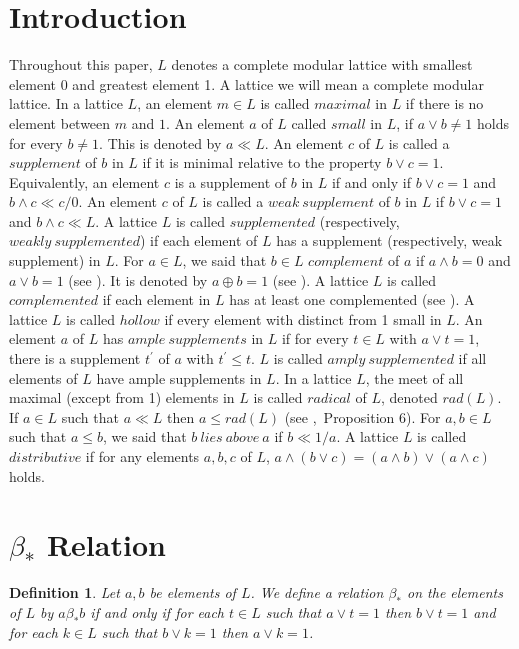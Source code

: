 \documentclass[a4paper,12pt]{article}
\newtheorem{definition}[theorem]{Definition}
\numberwithin{equation}{section}
\newcommand{\mycite}[2]{\textnormal{\cite{#1},~#2}}
\begin{document}
\section{Introduction}
Throughout this paper, $ L $ denotes a complete modular lattice with smallest element 0 and 
greatest element 1. A lattice we will mean a complete modular lattice. In a lattice $ L $, an element $ m \in L $ is called $ maximal $ in $ L $ if there is no element between $ m $ and $ 1 $. An element $ a $ of $ L $ 
called $ small $ in $ L $, if $ a \vee b \neq 1 $ holds for every $ b \neq 1 $. This is denoted by $ a \ll L $. An element $ c $ of $ L $ is called a $ supplement $ of $ b $ in $ L $ 
if it is minimal relative to the property $ b \vee c = 1 $. Equivalently, an element $ c $ is a supplement of $ b $ in $ L $ if and only if $ b \vee c = 1 $ and 
$ b \wedge c \ll c/0 $. An element $ c $ of $ L $ is called a $ weak \ supplement $ of $ b $ in $ L $ if $ b \vee c = 1 $ and $ b \wedge c \ll L $. A lattice $ L $ is called 
$ supplemented $ (respectively, $ weakly \ supplemented $) if each element of $ L $ has a supplement (respectively, weak supplement) in $ L $.
For $ a \in L $, we said that $ b \in L $ $ complement $ of $ a $ if $ a \wedge b = 0 $ and $ a \vee b = 1 $ (see \cite{davey}). It is denoted by $ a \oplus b = 1 $ (see \cite{calugeranu}). 
A lattice $ L $ is called $ complemented $ if each element in $ L $ has at least one complemented (see \cite{calugeranu}). A lattice $ L $ is called $ hollow $ if every element with distinct from 
1 small in $ L $. An element $ a $ of $ L $ has $ ample \  supplements $ in $ L $ if for every $ t \in L $ with  $ a \vee t = 1 $, there is a supplement $ t^{'} $ of $ a $ with $ t^{'} \leq t $. 
$ L $ is called $ amply \ supplemented $ if all elements of $ L $ have ample supplements in $ L $. 
In a lattice $ L $, the meet of all maximal (except from 1) elements in $ L $ is called $ radical $ of $ L $, denoted $rad(L) $.  
If $ a \in L $ such that $ a \ll L $ then $ a \leq rad(L) $ (see \mycite{stenstrom}{Proposition 6}). 
For $ a,b \in L $ such that $ a \leq b $, we said that $ b \ lies \ above \ a $ if $ b \ll 1/a $. 
A lattice $ L $ is called $ distributive $ if for any elements $ a,b,c $ of $ L $, $ a \wedge ( b \vee c ) = ( a \wedge b ) \vee ( a \wedge c) $ holds.
\section{$ \beta_* $ Relation}
\begin{definition} \label{1}
  Let $ a,b $ be elements of $ L $. We define a relation $ \beta_* $ on the elements of $ L $ by 
  $ a \beta_* b $ if and only if for each $ t \in L $ such that $ a \vee t = 1 $ then $ b \vee t = 1 $ and for each 
  $ k \in L $ such that $ b \vee k = 1 $ then $ a \vee k = 1 $. 

\end{definition}
\end{document}
